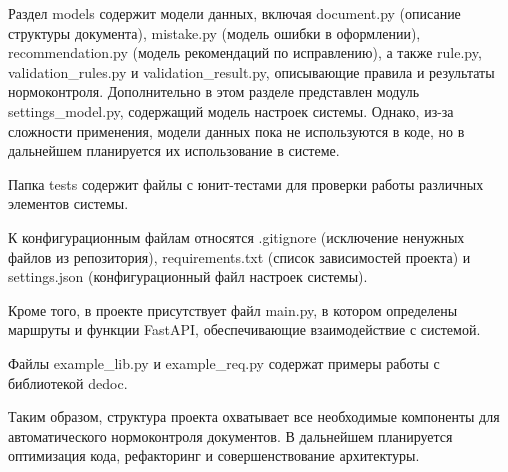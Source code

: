 \documentclass{report}
\begin{document}
Раздел models содержит модели данных, включая document.py (описание структуры документа), mistake.py (модель ошибки в оформлении), recommendation.py (модель рекомендаций по исправлению), а также rule.py, validation\_rules.py и validation\_result.py, описывающие правила и результаты нормоконтроля. Дополнительно в этом разделе представлен модуль settings\_model.py, содержащий модель настроек системы. Однако, из-за сложности применения, модели данных пока не используются в коде, но в дальнейшем планируется их использование в системе.

Папка tests содержит файлы с юнит-тестами для проверки работы различных элементов системы.

К конфигурационным файлам относятся .gitignore (исключение ненужных файлов из репозитория), requirements.txt (список зависимостей проекта) и settings.json (конфигурационный файл настроек системы).

Кроме того, в проекте присутствует файл main.py, в котором определены маршруты и функции FastAPI, обеспечивающие взаимодействие с системой.

Файлы example\_lib.py и example\_req.py содержат примеры работы с библиотекой dedoc.

Таким образом, структура проекта охватывает все необходимые компоненты для автоматического нормоконтроля документов. В дальнейшем планируется оптимизация кода, рефакторинг и совершенствование архитектуры.




\end{document}
